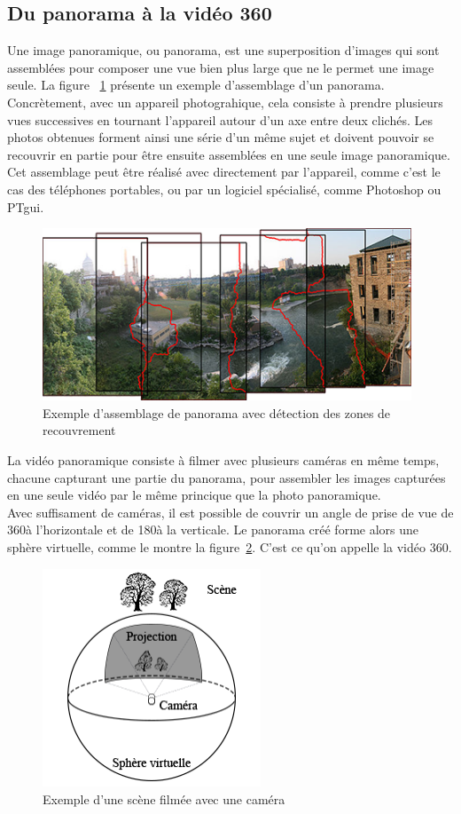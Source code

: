 \subsection{Du panorama à la vidéo 360}
Une image panoramique, ou panorama, est une superposition d'images qui sont assemblées
pour composer une vue bien plus large que ne le permet une image seule. La figure~ 
\ref{rochester-ny} présente un exemple d'assemblage d'un panorama.\\
Concrètement, avec un appareil photograhique, cela consiste à prendre plusieurs vues
successives en tournant l'appareil autour d'un axe entre deux clichés. 
Les photos obtenues forment ainsi une série d'un même sujet et doivent pouvoir 
se recouvrir en partie pour être ensuite assemblées en une seule image panoramique. 
Cet assemblage peut être réalisé avec directement par l'appareil, comme c'est le cas des 
téléphones portables, ou par un logiciel spécialisé, comme Photoshop\cite{photomerge} 
ou PTgui\cite{PTgui}.
\begin{figure}
  \centering
  \includegraphics[width=11cm]{images/rochester-ny.png}
  \caption{Exemple d'assemblage de panorama avec détection des zones de recouvrement\cite{RochesterNY}}
  \label{rochester-ny}
\end{figure}
\newline
La vidéo panoramique consiste à filmer avec plusieurs caméras en même temps, chacune
capturant une partie du panorama, pour assembler les images capturées en une seule
vidéo par le même princique que la photo panoramique.\\
Avec suffisament de caméras, il est possible de couvrir un angle de prise de vue 
de 360\degree à l'horizontale et de 180\degree à la verticale. Le panorama créé
forme alors une sphère virtuelle, comme le montre la figure~\ref{camera-projection}. 
C'est ce qu'on appelle la vidéo 360.
\begin{figure}
  \centering
  \includegraphics[width=6.5cm]{images/camera-projection.png}
  \caption{Exemple d'une scène filmée avec une caméra}
  \label{camera-projection}
\end{figure}

